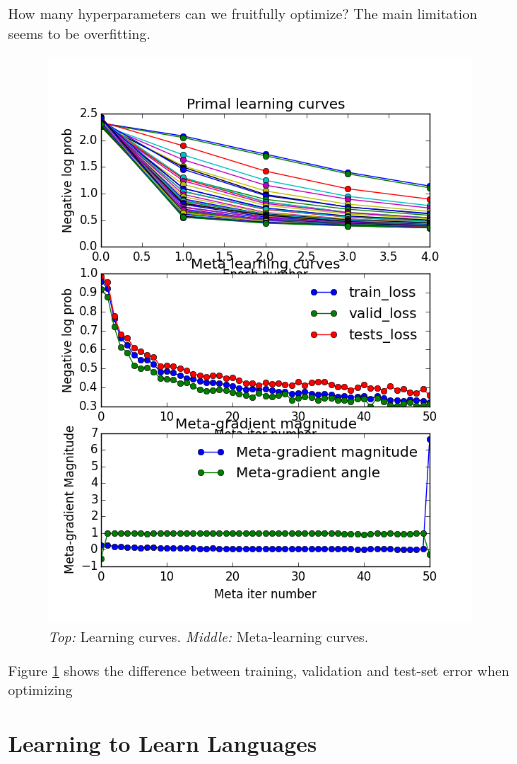 \documentclass{article}
\begin{document}
How many hyperparameters can we fruitfully optimize?
The main limitation seems to be overfitting.

\begin{figure}[h!]
\vskip 0.2in
\begin{center}
\centerline{\includegraphics[width=\columnwidth]{../experiments/Jan_28_training_schedule/4_training_loss_nn/learning_curves.png}}
\caption{\emph{Top:} Learning curves.  \emph{Middle:} Meta-learning curves. }
\label{fig:nn meta-learning curves}
\end{center}
\vskip -0.2in
\end{figure} 

Figure \ref{fig:nn meta-learning curves} shows the difference between training, validation and test-set error when optimizing 


\subsection{Learning to Learn Languages}
\end{document}
